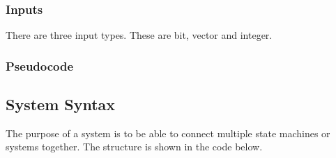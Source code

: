 \subsubsection{Inputs}
There are three input types. These are bit, vector and integer.

\subsubsection{Pseudocode}


\subsection{System Syntax}
The purpose of a system is to be able to connect multiple state machines or
systems together. The structure is shown in the code below.


